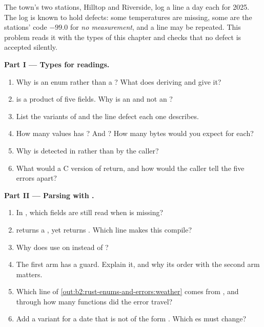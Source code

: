 \begin{problem}\label{pb:b2:rust-enums-and-errors:1}
The town's two stations, Hilltop and Riverside, log a line a day each for 2025. The log is known to hold defects: some
temperatures are missing, some are the stations' code $-99.0$ for \emph{no measurement}, and a line may be repeated.
This problem reads it with the types of this chapter and checks that no defect is accepted silently.

\medskip\noindent\textbf{Part I --- Types for readings.}\par\nopagebreak
\begin{enumerate}[beginpenalty=10000]
\item Why is  an enum rather than a ? What does deriving  and  give it?
\item {} is a product of five fields. Why is  an  and not an
?
\item List the variants of  and the line defect each one describes.
\item How many values has ? And ? How many bytes would you expect for each?
\item Why is  detected in  rather than by the caller?
\item What would a C version of  return, and how would the caller tell the five errors apart?
\end{enumerate}

\medskip\noindent\textbf{Part II --- Parsing with .}\par\nopagebreak
{}
\begin{enumerate}[resume, beginpenalty=10000]
\item In , which fields are still read when  is missing?
\item {} returns a , yet  returns . Which
line makes this compile?
\item Why does  use  on  instead of ?
\item The first  arm has a guard. Explain it, and why its order with the second  arm matters.
\item Which line of \cref{out:b2:rust-enums-and-errors:weather} comes from , and through how many
functions did the error travel?
\item Add a variant for a date that is not of the form . Which es must change?
\end{enumerate}


\end{problem}
